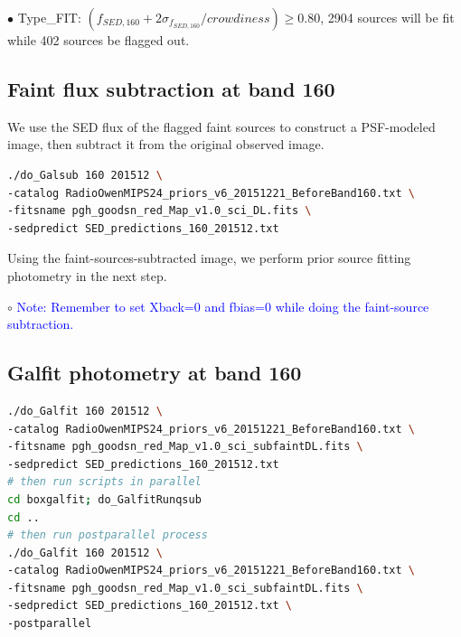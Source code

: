 \documentclass[11pt,a4paper]{article}
\begin{document}
\indent\hspace{15pt}$\bullet$ 
Type\_FIT: $(f_{SED,160}+2\sigma_{f_{SED,160}}/crowdiness) \ge 0.80$, 2904 sources will be fit while 402 sources be flagged out. 
\\

\subsection{Faint flux subtraction at band 160}
\label{Band160_Galsub}

We use the SED flux of the flagged faint sources to construct a PSF-modeled image, then subtract it from the original observed image. 

\begin{lstlisting}[language=bash]
./do_Galsub 160 201512 \
-catalog RadioOwenMIPS24_priors_v6_20151221_BeforeBand160.txt \
-fitsname pgh_goodsn_red_Map_v1.0_sci_DL.fits \
-sedpredict SED_predictions_160_201512.txt
\end{lstlisting}


Using the faint-sources-subtracted image, we perform prior source fitting photometry in the next step. 

\indent\hspace{15pt}$\circ$ 
\textcolor{blue}{Note: Remember to set Xback=0 and fbias=0 while doing the faint-source subtraction.}
\\

\subsection{Galfit photometry at band 160}
\label{Band160_Galfit}

\begin{lstlisting}[language=bash]
./do_Galfit 160 201512 \
-catalog RadioOwenMIPS24_priors_v6_20151221_BeforeBand160.txt \
-fitsname pgh_goodsn_red_Map_v1.0_sci_subfaintDL.fits \
-sedpredict SED_predictions_160_201512.txt
# then run scripts in parallel 
cd boxgalfit; do_GalfitRunqsub
cd ..
# then run postparallel process
./do_Galfit 160 201512 \
-catalog RadioOwenMIPS24_priors_v6_20151221_BeforeBand160.txt \
-fitsname pgh_goodsn_red_Map_v1.0_sci_subfaintDL.fits \
-sedpredict SED_predictions_160_201512.txt \
-postparallel
\end{lstlisting}
\end{document}
